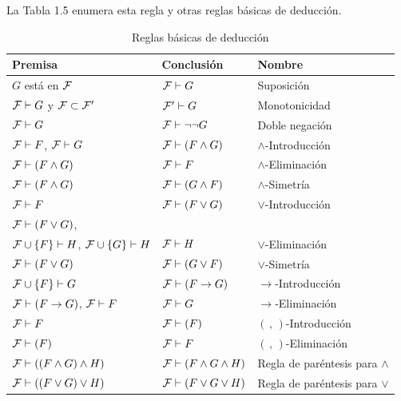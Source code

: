 \documentclass[12pt,a4paper]{book}
\begin{document}
    La Tabla 1.5 enumera esta regla y otras reglas básicas de deducción.

    \begin{table}[htbp]
        \centering
        \small
        \caption{Reglas básicas de deducción}
        \renewcommand{\arraystretch}{1.5}
        \setlength{\tabcolsep}{8pt}
        \begin{tabular}{l l l}
            Premisa & Conclusión & Nombre\\
            \hline
            $G$ está en $\mathcal{F}$ & $\mathcal{F}\vdash G$ & Suposición\\
            $\mathcal{F}\vdash G$ y $\mathcal{F}\subset\mathcal{F}'$ & $\mathcal{F}'\vdash G$ & Monotonicidad\\
            $\mathcal{F}\vdash G$ & $\mathcal{F}\vdash\neg\neg G$ & Doble negación\\
            $\mathcal{F}\vdash F$, $\mathcal{F}\vdash G$ & $\mathcal{F}\vdash(F\wedge G)$ & $\wedge$-Introducción\\
            $\mathcal{F}\vdash(F\wedge G)$ & $\mathcal{F}\vdash F$ & $\wedge$-Eliminación\\
            $\mathcal{F}\vdash(F\wedge G)$ & $\mathcal{F}\vdash(G\wedge F)$ & $\wedge$-Simetría\\
            $\mathcal{F}\vdash F$ & $\mathcal{F}\vdash(F\vee G)$ & $\vee$-Introducción\\
            $\mathcal{F}\vdash(F\vee G)$, & & \\
            $\mathcal{F}\cup\{F\}\vdash H$, $\mathcal{F}\cup\{G\}\vdash H$ & $\mathcal{F}\vdash H$ & $\vee$-Eliminación\\
            $\mathcal{F}\vdash(F\vee G)$ & $\mathcal{F}\vdash(G\vee F)$ & $\vee$-Simetría\\
            $\mathcal{F}\cup\{F\}\vdash G$ & $\mathcal{F}\vdash(F\rightarrow G)$ & $\rightarrow$-Introducción\\
            $\mathcal{F}\vdash(F\rightarrow G)$, $\mathcal{F}\vdash F$ & $\mathcal{F}\vdash G$ & $\rightarrow$-Eliminación\\
            $\mathcal{F}\vdash F$ & $\mathcal{F}\vdash(F)$ & $(\,,\,)$-Introducción\\
            $\mathcal{F}\vdash(F)$ & $\mathcal{F}\vdash F$ & $(\,,\,)$-Eliminación\\
            $\mathcal{F}\vdash((F\wedge G)\wedge H)$ & $\mathcal{F}\vdash(F\wedge G\wedge H)$ & Regla de paréntesis para $\wedge$\\
            $\mathcal{F}\vdash((F\vee G)\vee H)$ & $\mathcal{F}\vdash(F\vee G\vee H)$ & Regla de paréntesis para $\vee$\\
        \end{tabular}
    \end{table}
\end{document}
